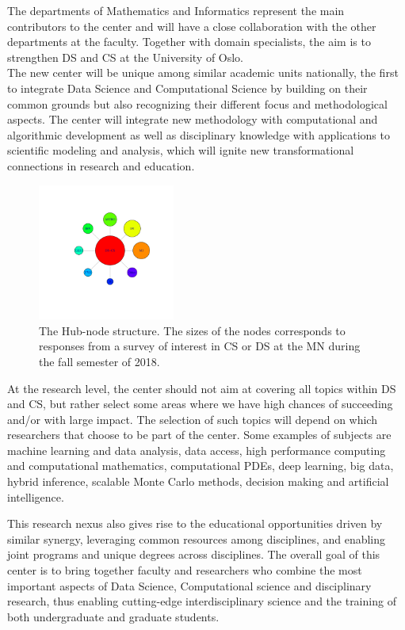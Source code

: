 \documentclass[a4paper,10pt]{article}
\begin{document}
The departments of  Mathematics and Informatics represent the main contributors to the center and will have a close collaboration with the other departments at the faculty.  Together with domain specialists, the aim is to strengthen DS and CS at the University of Oslo.\\


The new center  will be unique among similar academic units nationally, the first to integrate
Data Science and Computational Science by building on their common grounds but also recognizing their different focus and methodological aspects.
The center will integrate new methodology with computational and algorithmic development as well as  disciplinary knowledge with applications to scientific modeling and analysis, which will ignite new transformational connections in research and education.
\begin{figure}
\centering
\includegraphics[width=0.4\textwidth,trim={2.4cm 4.4cm 1.8cm 3.6cm},clip]{Hub_node.pdf}
\caption{\label{fig:hub}The Hub-node structure. The sizes of the nodes corresponds to responses from a survey of interest in CS or DS at the MN during the  fall semester of 2018.}
\end{figure}

At the research level, the center should not aim at covering all topics within DS and CS, but rather select some areas where we have high chances of succeeding and/or with large impact. The selection of such topics will depend on which researchers that choose to be part of the center. Some examples of subjects are machine learning and data analysis, data access, high performance computing and computational mathematics, computational PDEs, deep learning, big data, hybrid inference, scalable Monte Carlo methods, decision making and artificial intelligence.

This research nexus also gives rise to the educational opportunities driven by similar synergy, leveraging common resources among disciplines, and enabling joint programs and unique degrees across disciplines. The overall goal of this center is to bring together faculty and researchers who combine the most important aspects of Data Science, Computational science and disciplinary research, thus enabling cutting-edge interdisciplinary science and the training of both undergraduate and graduate students.
\end{document}
